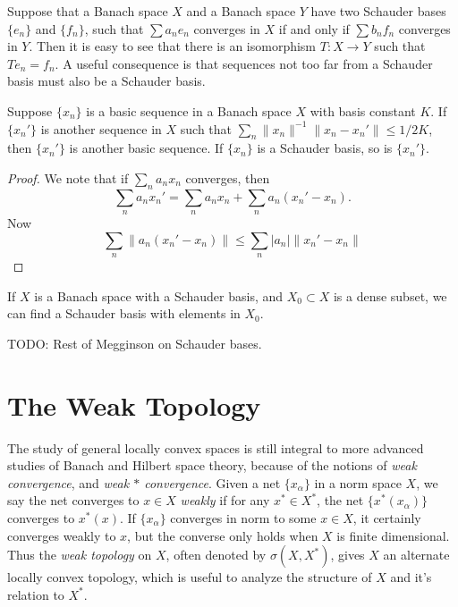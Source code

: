 Suppose that a Banach space $X$ and a Banach space $Y$ have two Schauder bases $\{ e_n \}$ and $\{ f_n \}$, such that $\sum a_n e_n$ converges in $X$ if and only if $\sum b_n f_n$ converges in $Y$. Then it is easy to see that there is an isomorphism $T: X \to Y$ such that $Te_n = f_n$. A useful consequence is that sequences not too far from a Schauder basis must also be a Schauder basis.

\begin{theorem}
    Suppose $\{ x_n \}$ is a basic sequence in a Banach space $X$ with basis constant $K$. If $\{ x_n' \}$ is another sequence in $X$ such that $\sum_n \| x_n \|^{-1} \| x_n - x_n' \| \leq 1/2K$, then $\{ x_n' \}$ is another basic sequence. If $\{ x_n \}$ is a Schauder basis, so is $\{ x_n' \}$.
\end{theorem}
\begin{proof}
    We note that if $\sum_n a_n x_n$ converges, then
    \[ \sum_n a_n x_n' = \sum_n a_n x_n + \sum_n a_n (x_n' - x_n). \]
    Now
    \[ \sum_n \| a_n (x_n' - x_n) \| \leq \sum_n |a_n| \| x_n' - x_n \| \]
\end{proof}

\begin{corollary}
    If $X$ is a Banach space with a Schauder basis, and $X_0 \subset X$ is a dense subset, we can find a Schauder basis with elements in $X_0$.
\end{corollary}

TODO: Rest of Megginson on Schauder bases.





\section{The Weak Topology}

The study of general locally convex spaces is still integral to more advanced studies of Banach and Hilbert space theory, because of the notions of \emph{weak convergence}, and \emph{weak $*$ convergence}. Given a net $\{ x_\alpha \}$ in a norm space $X$, we say the net converges to $x \in X$ \emph{weakly} if for any $x^* \in X^*$, the net $\{ x^*(x_\alpha) \}$ converges to $x^*(x)$. If $\{ x_\alpha \}$ converges in norm to some $x \in X$, it certainly converges weakly to $x$, but the converse only holds when $X$ is finite dimensional. Thus the \emph{weak topology} on $X$, often denoted by $\sigma(X,X^*)$, gives $X$ an alternate locally convex topology, which is useful to analyze the structure of $X$ and it's relation to $X^*$.

